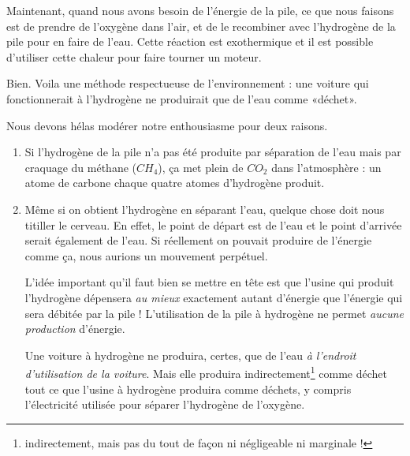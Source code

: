 Maintenant, quand nous avons besoin de l'énergie de la pile, ce que nous faisons est de prendre de l'oxygène dans l'air, et de le recombiner avec l'hydrogène de la pile pour en faire de l'eau. Cette réaction est exothermique et il est possible d'utiliser cette chaleur pour faire tourner un moteur.

\begin{idee}
Bien. Voila une méthode respectueuse de l'environnement : une voiture qui fonctionnerait à l'hydrogène ne produirait que de l'eau comme «déchet».
\end{idee}

Nous devons hélas modérer notre enthousiasme pour deux raisons.

\begin{enumerate}

	\item
		Si l'hydrogène de la pile n'a pas été produite par séparation de l'eau mais par craquage du méthane ($CH_4$), ça met plein de $CO_2$ dans l'atmosphère : un atome de carbone chaque quatre atomes d'hydrogène produit.

	\item
		Même si on obtient l'hydrogène en séparant l'eau, quelque chose doit nous titiller le cerveau. En effet, le point de départ est de l'eau et le point d'arrivée serait également de l'eau. Si réellement on pouvait produire de l'énergie comme ça, nous aurions un mouvement perpétuel.

		L'idée important qu'il faut bien se mettre en tête est que l'usine qui produit l'hydrogène dépensera \emph{au mieux} exactement autant d'énergie que l'énergie qui sera débitée par la pile ! L'utilisation de la pile à hydrogène ne permet \emph{aucune production} d'énergie.

		Une voiture à hydrogène ne produira, certes, que de l'eau \emph{à l'endroit d'utilisation de la voiture}. Mais elle produira indirectement\footnote{indirectement, mais pas du tout de façon ni négligeable ni marginale !} comme déchet tout ce que l'usine à hydrogène produira comme déchets, y compris l'électricité utilisée pour séparer l'hydrogène de l'oxygène.

\end{enumerate}

